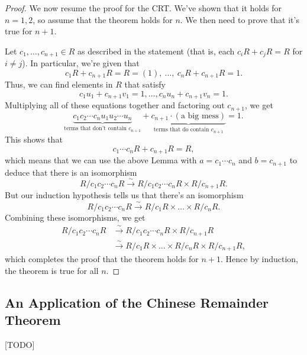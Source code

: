 \documentclass[math1530-lecture-notes]{subfiles}
\begin{document}
\begin{proof}[Proof]
  We now resume the proof for the CRT. We've shown that it holds for $n=1,2$, so assume that the
  theorem holds for $n$. We then need to prove that it's true for $n+1$.

  Let $c_1,\ldots,c_{n+1}\in R$ as described in the statement (that is, each $c_iR+c_jR=R$ for
  $i\neq j$). In particular, we're given that \[
    c_1R+c_{n+1}R=R=(1),\ \ldots,\ c_nR+c_{n+1}R=1
  .\] Thus, we can find elements in $R$ that satisfy \[
    c_1u_1+c_{n+1}v_1=1,\ldots,c_nu_n+c_{n+1}v_{n}=1
  .\] Multiplying all of these equations together and factoring out $c_{n+1}$, we get \[
    \underbrace{c_1c_2\cdots c_nu_1u_2\cdots u_n}_\text{terms that don't contain
    $c_{n+1}$}+\underbrace{c_{n+1}\cdot (\text{a big mess})}_\text{terms that do contain
  $c_{n+1}$}=1
  .\] This shows that \[
    c_1\cdots c_nR+c_{n+1}R=R
  ,\] which means that we can use the above Lemma with $a=c_1\cdots c_n$ and $b=c_{n+1}$ to deduce
  that there is an isomorphism \[
    R /c_1c_2\cdots c_nR\xrightarrow{\sim}R /c_1c_2\cdots c_nR \times R /c_{n+1}R
  .\] But our induction hypothesis tells us that there's an isomorphism \[
    R /c_1c_2\cdots c_nR\xrightarrow{\sim}R /c_1R\times \ldots\times R /c_nR
  .\] Combining these isomorphisms, we get
  \begin{align*}
    R /c_1c_2\cdots c_nR&\xrightarrow{\sim}R /c_1c_2\cdots c_nR \times R /c_{n+1}R\\
                        &\xrightarrow{\sim}R /c_1R\times \ldots\times R /c_nR\times R /c_{n+1}R
  ,\end{align*} which completes the proof that the theorem holds for $n+1$. Hence by induction, the
  theorem is true for all $n$.
\end{proof}

\subsection{An Application of the Chinese Remainder Theorem}

[TODO]
\end{document}
